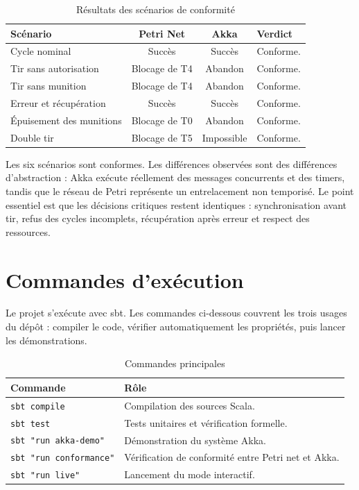 \documentclass[11pt,a4paper]{report}
\begin{document}
\begin{table}[H]
\centering
\caption{Résultats des scénarios de conformité}
\begin{tabularx}{\textwidth}{lccY}
\toprule
Scénario & Petri Net & Akka & Verdict \\
\midrule
Cycle nominal & Succès & Succès & Conforme. \\
Tir sans autorisation & Blocage de T4 & Abandon & Conforme. \\
Tir sans munition & Blocage de T4 & Abandon & Conforme. \\
Erreur et récupération & Succès & Succès & Conforme. \\
Épuisement des munitions & Blocage de T0 & Abandon & Conforme. \\
Double tir & Blocage de T5 & Impossible & Conforme. \\
\bottomrule
\end{tabularx}
\end{table}

Les six scénarios sont conformes. Les différences observées sont des différences d'abstraction : Akka exécute réellement des messages concurrents et des timers, tandis que le réseau de Petri représente un entrelacement non temporisé. Le point essentiel est que les décisions critiques restent identiques : synchronisation avant tir, refus des cycles incomplets, récupération après erreur et respect des ressources.

\section{Commandes d'exécution}
Le projet s'exécute avec sbt. Les commandes ci-dessous couvrent les trois usages du dépôt : compiler le code, vérifier automatiquement les propriétés, puis lancer les démonstrations.

\begin{table}[H]
\centering
\caption{Commandes principales}
\begin{tabularx}{\textwidth}{lY}
\toprule
Commande & Rôle \\
\midrule
\texttt{sbt compile} & Compilation des sources Scala. \\
\texttt{sbt test} & Tests unitaires et vérification formelle. \\
\texttt{sbt "run akka-demo"} & Démonstration du système Akka. \\
\texttt{sbt "run conformance"} & Vérification de conformité entre Petri net et Akka. \\
\texttt{sbt "run live"} & Lancement du mode interactif. \\
\bottomrule
\end{tabularx}
\end{table}
\end{document}
